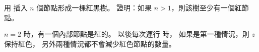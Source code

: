 \startEXERCISE
用  插入 $n$ 個節點形成一棵紅黑樹。
證明：如果 $n>1$，則該樹至少有一個紅節點。
\stopEXERCISE

\startANSWER
$n=2$ 時，有一個內部節點是紅的。
以後每次運行  時，
如果是第一種情況，則 $z$ 保持紅色，
另外兩種情況都不會減少紅色節點的數量。
\stopANSWER
